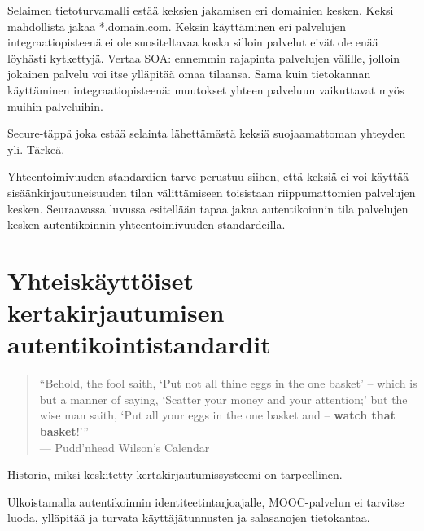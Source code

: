 \documentclass[finnish,gradu]{tktltiki}
\begin{document}
Selaimen tietoturvamalli estää keksien jakamisen eri domainien kesken. Keksi mahdollista jakaa *.domain.com. Keksin käyttäminen eri palvelujen integraatiopisteenä ei ole suositeltavaa koska silloin palvelut eivät ole enää löyhästi kytkettyjä. Vertaa SOA: ennemmin rajapinta palvelujen välille, jolloin jokainen palvelu voi itse ylläpitää omaa tilaansa. Sama kuin tietokannan käyttäminen integraatiopisteenä: muutokset yhteen palveluun vaikuttavat myös muihin palveluihin.

Secure-täppä joka estää selainta lähettämästä keksiä suojaamattoman yhteyden yli. Tärkeä.

Yhteentoimivuuden standardien tarve perustuu siihen, että keksiä ei voi käyttää sisäänkirjautuneisuuden tilan välittämiseen toisistaan riippumattomien palvelujen kesken. Seuraavassa luvussa esitellään tapaa jakaa autentikoinnin tila palvelujen kesken autentikoinnin yhteentoimivuuden standardeilla.




\section{Yhteiskäyttöiset kertakirjautumisen autentikointistandardit} %
\label{sec:Kertakirjautumisstandardit}
  \begin{quote}
      ``Behold, the fool saith, `Put not all thine eggs in the one basket'
      -- which is but a manner of saying, `Scatter your money and your attention;'
      but the wise man saith, `Put all your eggs in the one basket and -- \textbf{watch that basket}!'''
      \\--- Pudd'nhead Wilson's Calendar~\cite{twain_eggs_1894}
  \end{quote}

  Historia, miksi keskitetty kertakirjautumissysteemi on tarpeellinen.

  Ulkoistamalla autentikoinnin identiteetintarjoajalle, MOOC-palvelun ei tarvitse luoda, ylläpitää ja turvata käyttäjätunnusten ja salasanojen tietokantaa.
\end{document}
